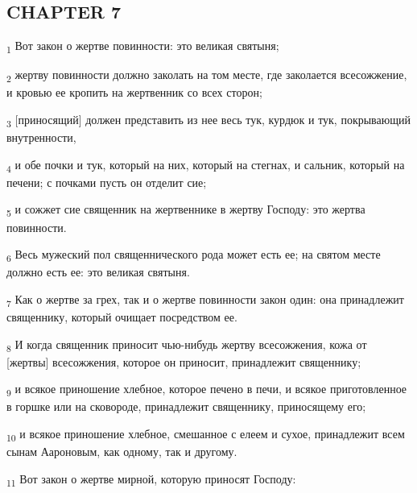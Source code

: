 \subsection{CHAPTER 7}
\begin{tcolorbox}
\textsubscript{1} Вот закон о жертве повинности: это великая святыня;
\end{tcolorbox}
\begin{tcolorbox}
\textsubscript{2} жертву повинности должно заколать на том месте, где заколается всесожжение, и кровью ее кропить на жертвенник со всех сторон;
\end{tcolorbox}
\begin{tcolorbox}
\textsubscript{3} [приносящий] должен представить из нее весь тук, курдюк и тук, покрывающий внутренности,
\end{tcolorbox}
\begin{tcolorbox}
\textsubscript{4} и обе почки и тук, который на них, который на стегнах, и сальник, который на печени; с почками пусть он отделит сие;
\end{tcolorbox}
\begin{tcolorbox}
\textsubscript{5} и сожжет сие священник на жертвеннике в жертву Господу: это жертва повинности.
\end{tcolorbox}
\begin{tcolorbox}
\textsubscript{6} Весь мужеский пол священнического рода может есть ее; на святом месте должно есть ее: это великая святыня.
\end{tcolorbox}
\begin{tcolorbox}
\textsubscript{7} Как о жертве за грех, так и о жертве повинности закон один: она принадлежит священнику, который очищает посредством ее.
\end{tcolorbox}
\begin{tcolorbox}
\textsubscript{8} И когда священник приносит чью-нибудь жертву всесожжения, кожа от [жертвы] всесожжения, которое он приносит, принадлежит священнику;
\end{tcolorbox}
\begin{tcolorbox}
\textsubscript{9} и всякое приношение хлебное, которое печено в печи, и всякое приготовленное в горшке или на сковороде, принадлежит священнику, приносящему его;
\end{tcolorbox}
\begin{tcolorbox}
\textsubscript{10} и всякое приношение хлебное, смешанное с елеем и сухое, принадлежит всем сынам Аароновым, как одному, так и другому.
\end{tcolorbox}
\begin{tcolorbox}
\textsubscript{11} Вот закон о жертве мирной, которую приносят Господу:
\end{tcolorbox}
